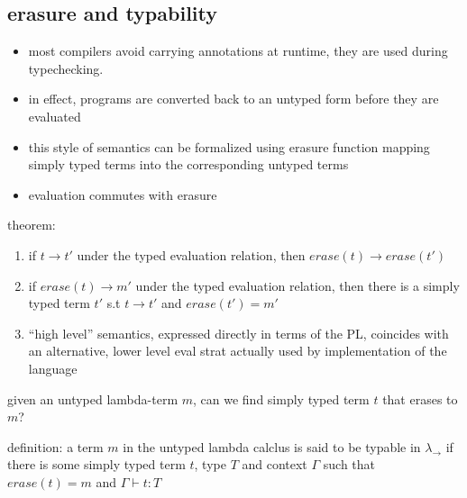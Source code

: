 \documentclass[11pt]{article}
\begin{document}
\subsection{erasure and typability}
\label{sec:orgce5a536}
\begin{itemize}
\item most compilers avoid carrying annotations at runtime, they are used during typechecking.
\item in effect, programs are converted back to an untyped form before they are evaluated
\item this style of semantics can be formalized using erasure function mapping simply typed terms into the corresponding untyped terms
\item evaluation commutes with erasure
\end{itemize}


theorem:
\begin{enumerate}
\item if \(t \rightarrow t'\) under the typed evaluation relation, then \(erase(t) \rightarrow erase(t')\)
\item if \(erase(t) \rightarrow m'\) under the typed evaluation relation, then there is a simply typed term \(t'\) s.t \(t \rightarrow t'\) and \(erase(t') = m'\)

\item ``high level'' semantics, expressed directly in terms of the PL, coincides with an alternative, lower level eval strat actually used by implementation of the language
\end{enumerate}

given an untyped lambda-term \(m\), can we find simply typed term \(t\) that erases to \(m\)?

definition: a term \(m\) in the untyped lambda calclus is said to be typable in \(\lambda_{\rightarrow}\) if there is some simply typed term \(t\), type \(T\) and context \(\Gamma\) such that \(erase(t) = m\) and \(\Gamma \vdash t : T\)
\end{document}
